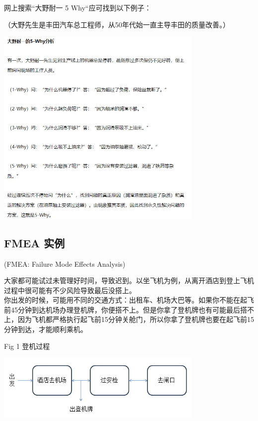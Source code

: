 网上搜索``大野耐一 5 Why``应可找到以下例子：

\begin{description}
\tightlist
\item[]
（大野先生是丰田汽车总工程师，从50年代始一直主导丰田的质量改善。）
\end{description}


\includegraphics[width=10cm]{5whyScreenshot20221203092224.jpg}

\hypertarget{fmea-ux5b9eux4f8b}{%
\subsection{FMEA 实例}\label{fmea-ux5b9eux4f8b}}

\begin{description}
\tightlist
\item[]
(FMEA: Failure Mode Effects Analysis)
\end{description}

大家都可能试过未管理好时间，导致迟到。以坐飞机为例，从离开酒店到登上飞机过程中很可能有不少风险导致最后没搭上。\\
你出发的时候，可能用不同的交通方式：出租车、机场大巴等。如果你不能在起飞前45分钟到达机场办理登机牌，你便搭不上。但是你拿了登机牌也有可能最后搭不上，因为飞机都严格执行起飞前15分钟关舱门，所以你拿了登机牌也要在起飞前15分钟到达，才能顺利乘机。

Fig 1 登机过程


\includegraphics[width=10cm]{风险与机会1.png}

